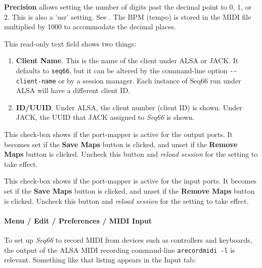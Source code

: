    \textbf{Precision}
   allows setting the number of digits past the decimal point to 0, 1, or 2.
   This is also a 'usr' setting.
   See .
   The BPM (tempo) is stored in the MIDI file multiplied by 1000 to accommodate
   the decimal places.

   This read-only text field shows two things:

   \begin{enumerate}
      \item \textbf{Client Name}.
         This is the name of the client under ALSA or JACK.  It defaults to
         \texttt{seq66}, but it can be altered by the command-line option
         \texttt{-{}-client-name} or by a session manager.
         Each instance of Seq66 run under ALSA will have a different client ID.
      \item \textbf{ID/UUID}.
         Under ALSA, the client number (client ID) is shown.
         Under JACK, the UUID that JACK assigned to \textsl{Seq66} is shown.
   \end{enumerate}

   This check-box shows if the port-mapper is active for the output ports.
   It becomes set if the \textbf{Save Maps} button is clicked, and unset if the
   \textbf{Remove Maps} button is clicked.
   Uncheck this button and \textsl{reload session} for the setting
   to take effect.

   This check-box shows if the port-mapper is active for the input ports.
   It becomes set if the \textbf{Save Maps} button is clicked, and unset if the
   \textbf{Remove Maps} button is clicked.
   Uncheck this button and \textsl{reload session} for the setting
   to take effect.


\paragraph{Menu / Edit / Preferences / MIDI Input}
\label{paragraph:menu_edit_preferences_midi_input}

   To set up \textsl{Seq66} to record MIDI from devices such as
   controllers and keyboards, the output of the ALSA MIDI recording
   command-line \texttt{arecordmidi -l} is relevant.
   Something like that listing appears in the Input tab:


